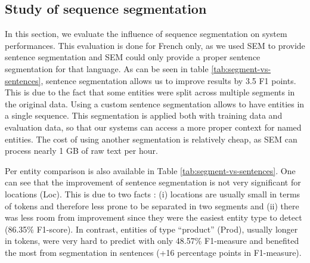\subsection{Study of sequence segmentation}
\label{sec:sequence_seg}

In this section, we evaluate the influence of sequence segmentation on system performances. This evaluation is done for French only, as we used SEM to provide sentence segmentation and SEM could only provide a proper sentence segmentation for that language. As can be seen in table \ref{tab:segment-vs-sentences}, sentence segmentation allows us to improve results by 3.5 F1 points. This is due to the fact that some entities were split across multiple segments in the original data. Using a custom sentence segmentation allows to have entities in a single sequence. This segmentation is applied both with training data and evaluation data, so that our systems can access a more proper context for named entities. The cost of using another segmentation is relatively cheap, as SEM can process nearly 1 GB of raw text per hour.

Per entity comparison is also available in Table \ref{tab:segment-vs-sentences}. One can see that the improvement of sentence segmentation is not very significant for locations (Loc). This is due to two facts : (i) locations are usually small in terms of tokens and therefore less prone to be separated in two segments and (ii) there was less room from improvement since they were the easiest entity type to detect (86.35\% F1-score). In contrast, entities of type ``product'' (Prod), usually longer in tokens, were very hard to predict with only 48.57\% F1-measure and benefited the most from segmentation in sentences (+16 percentage points in F1-measure).

